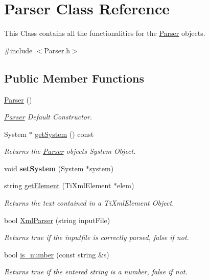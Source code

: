 \hypertarget{classParser}{}\section{Parser Class Reference}
\label{classParser}


This Class contains all the functionalities for the \hyperlink{classParser}{Parser} objects.  




{\ttfamily \#include $<$Parser.\+h$>$}

\subsection*{Public Member Functions}
\begin{DoxyCompactItemize}
\item 
\hyperlink{classParser_a12234f6cd36b61af4b50c94a179422c1}{Parser} ()\hypertarget{classParser_a12234f6cd36b61af4b50c94a179422c1}{}\label{classParser_a12234f6cd36b61af4b50c94a179422c1}

\begin{DoxyCompactList}\small\item\em \hyperlink{classParser}{Parser} Default Constructor. \end{DoxyCompactList}\item 
System $\ast$ \hyperlink{classParser_addad80574e43b744a82807d0f821d414}{get\+System} () const 
\begin{DoxyCompactList}\small\item\em Returns the \hyperlink{classParser}{Parser} object\textquotesingle{}s System Object. \end{DoxyCompactList}\item 
void {\bfseries set\+System} (System $\ast$system)\hypertarget{classParser_aaf58c6aafde4e7b889fbaa5d1f3aa6fe}{}\label{classParser_aaf58c6aafde4e7b889fbaa5d1f3aa6fe}

\item 
string \hyperlink{classParser_a36b746dbf631544851e0af2d0e7c6982}{get\+Element} (Ti\+Xml\+Element $\ast$elem)
\begin{DoxyCompactList}\small\item\em Returns the text contained in a Ti\+Xml\+Element Object. \end{DoxyCompactList}\item 
bool \hyperlink{classParser_aa8cdba8032e5d5d87b249be597b196c7}{Xml\+Parser} (string input\+File)
\begin{DoxyCompactList}\small\item\em Returns true if the inputfile is correctly parsed, false if not. \end{DoxyCompactList}\item 
bool \hyperlink{classParser_a9ae65850c9b4d607a539cbe14331db5f}{is\+\_\+number} (const string \&s)
\begin{DoxyCompactList}\small\item\em Returns true if the entered string is a number, false if not. \end{DoxyCompactList}\end{DoxyCompactItemize}


